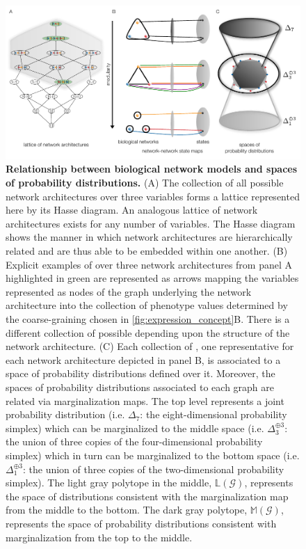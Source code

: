 


\begin{figure}[!ht]
\centering
\noindent\includegraphics[width=0.9\columnwidth]{fig/conediagram.pdf}
\caption{{\bf Relationship between biological network models and spaces of probability distributions.} (A) The collection of all possible network architectures over three variables forms a lattice represented here by its Hasse diagram. An analogous lattice of network architectures exists for any number of variables. The Hasse diagram shows the manner in which network architectures are hierarchically related and are thus able to be embedded within one another. (B) Explicit examples of \gnpm{} over three network architectures from panel A highlighted in green are represented as arrows mapping the variables represented as nodes of the graph underlying the network architecture into the collection of phenotype values determined by the coarse-graining chosen in \ref{fig:expression_concept}B. There is a different collection of possible \gnpm{} depending upon the structure of the network architecture. (C) Each collection of \gnpm{}, one representative for each network architecture depicted in panel B, is associated to a space of probability distributions defined over it. Moreover, the spaces of probability distributions associated to each graph are related via marginalization maps. The top level represents a joint probability distribution (i.e. $\Delta_7$: the eight-dimensional probability simplex) which can be marginalized to the middle space (i.e. $\Delta_3^{\oplus 3}$: the union of three copies of the four-dimensional probability simplex) which in turn can be marginalized to the bottom space (i.e. $\Delta_1^{\oplus 3}$: the union of three copies of the two-dimensional probability simplex). The light gray polytope in the middle, $\mathbb{L}(\mathcal{G})$, represents the space of distributions consistent with the marginalization map from the middle to the bottom. The dark gray polytope, $\mathbb{M}(\mathcal{G})$, represents the space of probability distributions consistent with marginalization from the top to the middle.}

\end{figure}
